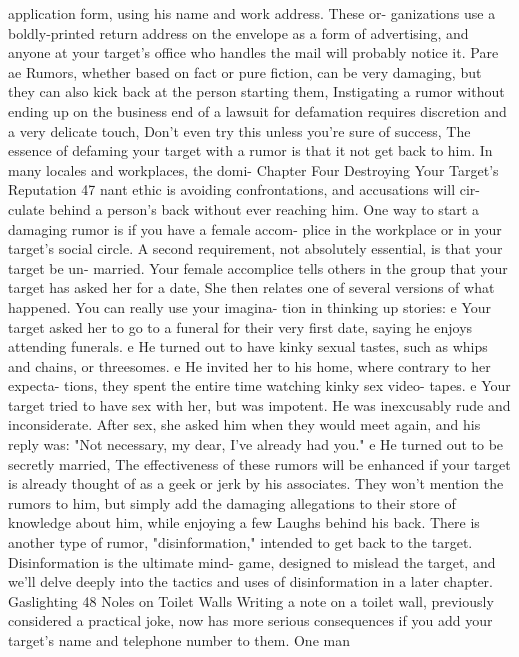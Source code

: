 \documentclass{book}
\begin{document}
application form, using his name and work address. These or- 
ganizations use a boldly-printed return address on the envelope 
as a form of advertising, and anyone at your target's office who 
handles the mail will probably notice it. 
Pare ae 
Rumors, whether based on fact or pure fiction, can be very 
damaging, but they can also kick back at the person starting 
them, Instigating a rumor without ending up on the business 
end of a lawsuit for defamation requires discretion and a very 
delicate touch, Don't even try this unless you're sure of success, 
The essence of defaming your target with a rumor is that it 
not get back to him. In many locales and workplaces, the domi- 
Chapter Four 
Destroying Your Target's Reputation 
47 
nant ethic is avoiding confrontations, and accusations will cir- 
culate behind a person's back without ever reaching him. One 
way to start a damaging rumor is if you have a female accom- 
plice in the workplace or in your target's social circle. A second 
requirement, not absolutely essential, is that your target be un- 
married. 
Your female accomplice tells others in the group that your 
target has asked her for a date, She then relates one of several 
versions of what happened. You can really use your imagina- 
tion in thinking up stories: 
e Your target asked her to go to a funeral for their very first 
date, saying he enjoys attending funerals. 
e He turned out to have kinky sexual tastes, such as whips 
and chains, or threesomes. 
e He invited her to his home, where contrary to her expecta- 
tions, they spent the entire time watching kinky sex video- 
tapes. 
e Your target tried to have sex with her, but was impotent. 
He was inexcusably rude and inconsiderate. After sex, she 
asked him when they would meet again, and his reply was: 
"Not necessary, my dear, I've already had you." 
e He turned out to be secretly married, 
The effectiveness of these rumors will be enhanced if your 
target is already thought of as a geek or jerk by his associates. 
They won't mention the rumors to him, but simply add the 
damaging allegations to their store of knowledge about him, 
while enjoying a few Laughs behind his back. 
There is another type of rumor, "disinformation," intended 
to get back to the target. Disinformation is the ultimate mind- 
game, designed to mislead the target, and we'll delve deeply 
into the tactics and uses of disinformation in a later chapter.  Gaslighting 
48 
Noles on Toilet Walls 
Writing a note on a toilet wall, previously considered a 
practical joke, now has more serious consequences if you add 
your target's name and telephone number to them. One man 
\end{document}
